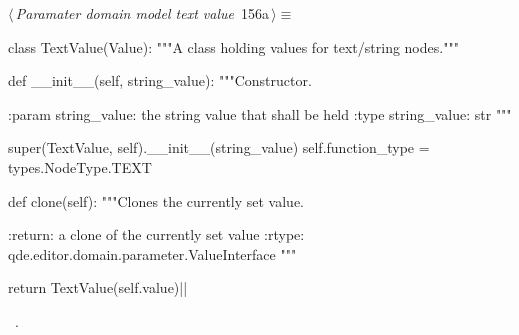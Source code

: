 \documentclass[%
    a4paper,    %
    justified,  %
    nobib,      %
    openany     %
]{tufte-book}
\begin{document}
\begin{flushleft} \small
\begin{minipage}{\linewidth}\label{scrap181}\raggedright\small
{} $\langle\,${\itshape Paramater domain model text value}\nobreak\ {\footnotesize {156a}}$\,\rangle\equiv$
\vspace{-1ex}
\begin{pythoncode}
class TextValue(Value):
    """A class holding values for text/string nodes."""

    def __init__(self, string_value):
        """Constructor.

        :param string_value: the string value that shall be held
        :type  string_value: str
        """

        super(TextValue, self).__init__(string_value)
        self.function_type = types.NodeType.TEXT

    def clone(self):
        """Clones the currently set value.

        :return: a clone of the currently set value
        :rtype:  qde.editor.domain.parameter.ValueInterface
        """

        return TextValue(self.value)|\NWsep|
\end{pythoncode}
\vspace{1.5ex}
\footnotesize
\begin{list}{}{\setlength{\itemsep}{-\parsep}\setlength{\itemindent}{-\leftmargin}}
\item \NWtxtMacroRefIn\ .

\item{}
\end{list}
\end{minipage}\vspace{4ex}
\end{flushleft}
\end{document}
